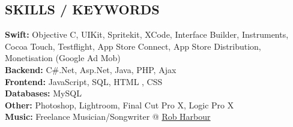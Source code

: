 \documentclass[margin,line]{resume}
\begin{document}
\begin{resume}
    \section{\mysidestyle \textbf{\large{S}\small{KILLS} / \large{K}\small{EYWORDS}}}
    
    \textbf{Swift:} Objective C, UIKit, Spritekit, XCode, Interface Builder, Instruments, Cocoa Touch, Testflight, App Store Connect, App Store Distribution, Monetisation (Google Ad Mob)  \\
    \textbf{Backend:} C\#.Net, Asp.Net, Java, PHP, Ajax \\
    \textbf{Frontend:} JavaScript, SQL, HTML , CSS\\
    \textbf{Databases:} MySQL\\
    \textbf{Other:} Photoshop, Lightroom, Final Cut Pro X, Logic Pro X\\
    \textbf{Music:} Freelance Musician/Songwriter @ \href{https://music.apple.com/gb/artist/rob-harbour/1151720833}{Rob Harbour}\\
\end{resume}
\end{document}
